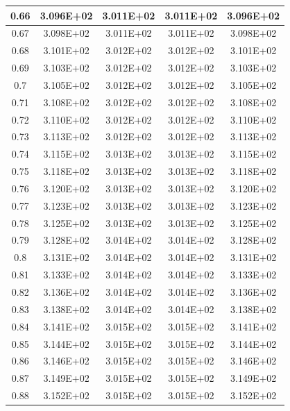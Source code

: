 \documentclass{article}
\begin{document}
\begin{center}
\begin{longtable}{|c|c|c|c|c|}
            0.66 & 3.096E+02 & 3.011E+02 & 3.011E+02 & 3.096E+02 \\ \hline
            0.67 & 3.098E+02 & 3.011E+02 & 3.011E+02 & 3.098E+02 \\ \hline
            0.68 & 3.101E+02 & 3.012E+02 & 3.012E+02 & 3.101E+02 \\ \hline
            0.69 & 3.103E+02 & 3.012E+02 & 3.012E+02 & 3.103E+02 \\ \hline
            0.7 & 3.105E+02 & 3.012E+02 & 3.012E+02 & 3.105E+02 \\ \hline
            0.71 & 3.108E+02 & 3.012E+02 & 3.012E+02 & 3.108E+02 \\ \hline
            0.72 & 3.110E+02 & 3.012E+02 & 3.012E+02 & 3.110E+02 \\ \hline
            0.73 & 3.113E+02 & 3.012E+02 & 3.012E+02 & 3.113E+02 \\ \hline
            0.74 & 3.115E+02 & 3.013E+02 & 3.013E+02 & 3.115E+02 \\ \hline
            0.75 & 3.118E+02 & 3.013E+02 & 3.013E+02 & 3.118E+02 \\ \hline
            0.76 & 3.120E+02 & 3.013E+02 & 3.013E+02 & 3.120E+02 \\ \hline
            0.77 & 3.123E+02 & 3.013E+02 & 3.013E+02 & 3.123E+02 \\ \hline
            0.78 & 3.125E+02 & 3.013E+02 & 3.013E+02 & 3.125E+02 \\ \hline
            0.79 & 3.128E+02 & 3.014E+02 & 3.014E+02 & 3.128E+02 \\ \hline
            0.8 & 3.131E+02 & 3.014E+02 & 3.014E+02 & 3.131E+02 \\ \hline
            0.81 & 3.133E+02 & 3.014E+02 & 3.014E+02 & 3.133E+02 \\ \hline
            0.82 & 3.136E+02 & 3.014E+02 & 3.014E+02 & 3.136E+02 \\ \hline
            0.83 & 3.138E+02 & 3.014E+02 & 3.014E+02 & 3.138E+02 \\ \hline
            0.84 & 3.141E+02 & 3.015E+02 & 3.015E+02 & 3.141E+02 \\ \hline
            0.85 & 3.144E+02 & 3.015E+02 & 3.015E+02 & 3.144E+02 \\ \hline
            0.86 & 3.146E+02 & 3.015E+02 & 3.015E+02 & 3.146E+02 \\ \hline
            0.87 & 3.149E+02 & 3.015E+02 & 3.015E+02 & 3.149E+02 \\ \hline
            0.88 & 3.152E+02 & 3.015E+02 & 3.015E+02 & 3.152E+02 \\ \hline

\end{longtable}
\end{center}
\end{document}
